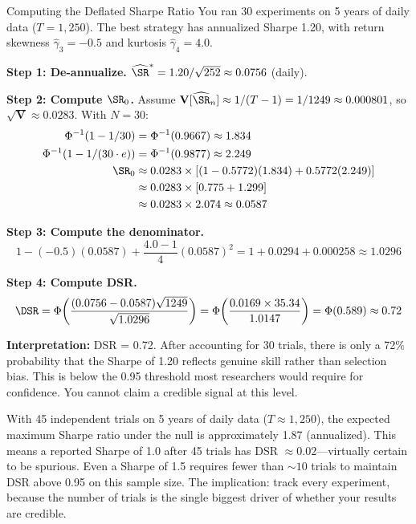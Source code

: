 \begin{workedexample}{Computing the Deflated Sharpe Ratio}
You ran 30 experiments on 5 years of daily data ($T = 1{,}250$). The best strategy has annualized Sharpe 1.20, with return skewness $\hat{\gamma}_3 = -0.5$ and kurtosis $\hat{\gamma}_4 = 4.0$.

\textbf{Step 1: De-annualize.} $\widehat{\SR}^* = 1.20 / \sqrt{252} \approx 0.0756$ (daily).

\textbf{Step 2: Compute $\SR_0$.} Assume $\mathbf{V}[\widehat{\SR}_n] \approx 1/(T-1) = 1/1249 \approx 0.000801$, so $\sqrt{\mathbf{V}} \approx 0.0283$. With $N = 30$:
\begin{align*}
\Phi^{-1}(1 - 1/30) &= \Phi^{-1}(0.9667) \approx 1.834 \\
\Phi^{-1}(1 - 1/(30 \cdot e)) &= \Phi^{-1}(0.9877) \approx 2.249 \\
\SR_0 &\approx 0.0283 \times [(1 - 0.5772)(1.834) + 0.5772(2.249)] \\
      &\approx 0.0283 \times [0.775 + 1.299] \\
      &\approx 0.0283 \times 2.074 \approx 0.0587
\end{align*}

\textbf{Step 3: Compute the denominator.}
\[
1 - (-0.5)(0.0587) + \frac{4.0 - 1}{4}(0.0587)^2 = 1 + 0.0294 + 0.000258 \approx 1.0296
\]

\textbf{Step 4: Compute DSR.}
\[
\DSR = \Phi\!\left(\frac{(0.0756 - 0.0587)\sqrt{1249}}{\sqrt{1.0296}}\right) = \Phi\!\left(\frac{0.0169 \times 35.34}{1.0147}\right) = \Phi(0.589) \approx 0.72
\]

\textbf{Interpretation:} DSR = 0.72. After accounting for 30 trials, there is only a 72\% probability that the Sharpe of 1.20 reflects genuine skill rather than selection bias. This is below the 0.95 threshold most researchers would require for confidence. You cannot claim a credible signal at this level.
\end{workedexample}

\begin{keyresult}
With 45 independent trials on 5 years of daily data ($T \approx 1{,}250$), the expected maximum Sharpe ratio under the null is approximately 1.87 (annualized). This means a reported Sharpe of 1.0 after 45 trials has DSR $\approx 0.02$---virtually certain to be spurious. Even a Sharpe of 1.5 requires fewer than ${\sim}10$ trials to maintain DSR above 0.95 on this sample size. The implication: track every experiment, because the number of trials is the single biggest driver of whether your results are credible.
\end{keyresult}

